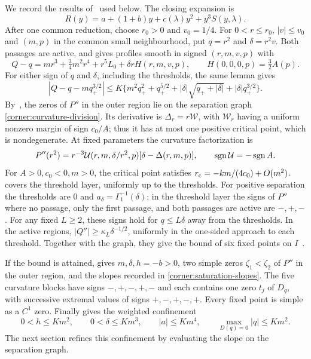 We record the results of~\cite{main2026} used below. The closing expansion
is
\begin{equation}\label{sup:closing}
 R(y)=a+(1+b)y+c(\lambda)y^2+y^3S(y,\lambda).
\end{equation}
After one common reduction, choose $r_0>0$ and $v_0=1/4$.
For $0<r\le r_0$, $|v|\le v_0$ and $(m,p)$ in the common small
neighbourhood, put $q=r^2$ and $\delta=r^2v$. Both passages are active,
and \cite[Lemma~\ref*{main-lem:exact-value-division}]{main2026} gives
profiles smooth in signed $(r,m,v,p)$ with
\begin{equation}\label{sup:root-division}
 Q-q=mr^3+\tfrac34m^2r^4+r^5L_0+\delta rH(r,m,v,p),
 \qquad H(0,0,0,p)=\tfrac32A(p).
\end{equation}
For either sign of $q$ and $\delta$, including the thresholds, the same lemma
gives
\begin{equation}\label{sup:global}
 |Q-q-mq_+^{3/2}|\leq K\{m^2q_+^2+q_+^{5/2}
       +|\delta|\sqrt{q_++|\delta|}+|\delta|q_+^{3/2}\}.
\end{equation}
By~\cite[Lemma~\ref*{main-lem:curvature-profile} and
Proposition~\ref*{main-prop:one-fold-graph}]{main2026}, the zeros of $P''$ in
the outer region lie on the separation graph \eqref{corner:curvature-division}.
Its derivative is
$\Delta_r=r\mathcal W$, with $\mathcal W_r$ having a uniform nonzero
margin of sign $c_0/A$;
thus it has at most one positive critical point, which is nondegenerate.
At fixed parameters the curvature factorization is
\[
 P''(r^2)=r^{-3}\mathcal U(r,m,\delta/r^2,p)
                  [\delta-\Delta(r,m,p)],\qquad \operatorname{sgn}\mathcal U=-\operatorname{sgn} A.
\]
For $A>0,c_0<0,m>0$, the critical point satisfies
$r_{\rm c}=-km/(4c_0)+O(m^2)$.
\cite[Lemma~\ref*{main-lem:event-layer}]{main2026} covers the threshold
layer, uniformly up to the thresholds. For positive separation the thresholds
are $0$ and $a_\delta=\Gamma_1^{-1}(\delta)$; in the threshold layer the signs
of $P''$ where no passage, only the first passage, and both passages are
active are $-,+,-$. For any fixed $L\geq2$, these signs hold for
$q\leq L\delta$ away from the thresholds. In the active regions,
$|Q''|\geq\kappa_L\delta^{-1/2}$, uniformly in the one-sided approach to
each threshold. Together with the
graph, they give the bound of six fixed points on
$I$~\cite[Proposition~\ref*{main-prop:common-count}]{main2026}.

If the bound is attained, \cite[Lemma~\ref*{main-sat:saturation}]{main2026}
gives $m,\delta,h=-b>0$, two simple zeros $\zeta_1<\zeta_2$ of $P''$ in the
outer region, and the slopes recorded in \eqref{corner:saturation-slopes}.
The five curvature blocks have signs $-,+,-,+,-$ and each contains one
zero $t_j$ of $D_q$, with successive extremal values of signs
$+,-,+,-,+$. Every fixed point is simple as a $C^1$ zero.
Finally \cite[Proposition~\ref*{main-sat:weighted-confinement}]{main2026}
gives the weighted confinement
\begin{equation}\label{sup:confinement}
 0<h\leq Km^2,\qquad 0<\delta\leq Km^3,\qquad
 |a|\leq Km^4,\qquad \max_{D(q)=0}|q|\leq Km^2.
\end{equation}
The next section refines this confinement by evaluating the slope on the
separation graph.
